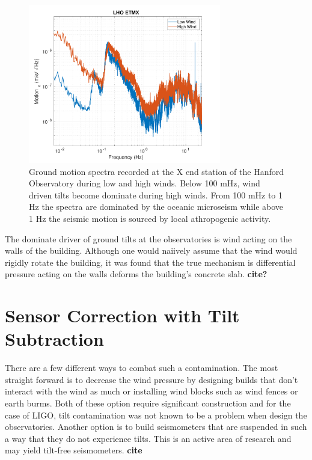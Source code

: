 \documentclass [12pt, proquest]{uwthesis}[2019]
\begin{document}
\begin{figure}%
\begin{center}
\includegraphics[width=0.75\textwidth]{windComp.pdf}
\caption{Ground motion spectra recorded at the X end station of the Hanford Observatory during low and high winds. Below 100 mHz, wind driven tilts become dominate during high winds. From 100 mHz to 1 Hz the spectra are dominated by the oceanic microseism while above 1 Hz the seismic motion is sourced by local athropogenic activity.}
\label{wind}
\end{center}
\end{figure}

The dominate driver of ground tilts at the observatories is wind acting on the walls of the building. Although one would naiively assume that the wind would rigidly rotate the building, it was found that the true mechanism is differential pressure acting on the walls deforms the building's concrete slab. \textbf{cite?} 

\section{Sensor Correction with Tilt Subtraction}

\quad There are a few different ways to combat such a contamination. The most straight forward is to decrease the wind pressure by designing builds that don't interact with the wind as much or installing wind blocks such as wind fences or earth burms. Both of these option require significant construction and for the case of LIGO, tilt contamination was not known to be a problem when design the observatories. Another option is to build seismometers that are suspended in such a way that they do not experience tilts. This is an active area of research and may yield tilt-free seismometers. \textbf{cite}
\end{document}
